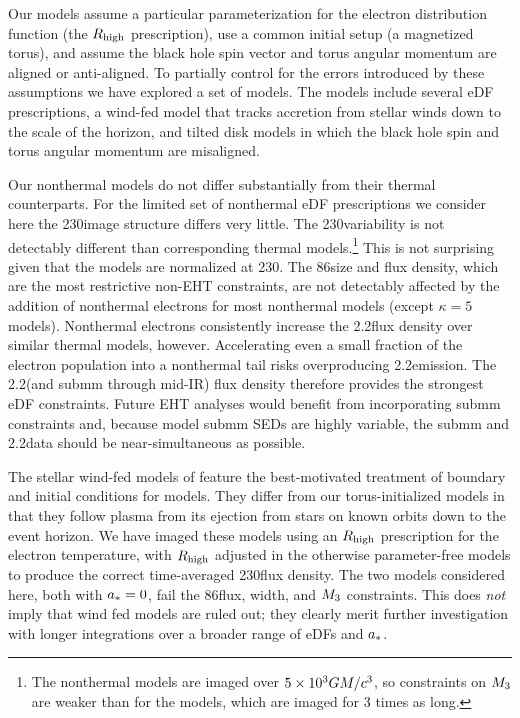 Our \fiducial models assume a particular parameterization for the electron distribution function (the $R_\mathrm{high}$ prescription), use a common initial setup (a magnetized torus), and assume the black hole spin vector and torus angular momentum are aligned or anti-aligned.
To partially control for the errors introduced by these assumptions we have explored a set of \extended models.
The \extended models include several eDF prescriptions, a wind-fed model that tracks accretion from stellar winds down to the scale of the horizon, and tilted disk models in which the black hole spin and torus angular momentum are misaligned.

Our nonthermal models do not differ substantially from their thermal counterparts.
For the limited set of nonthermal eDF prescriptions we consider here the 230\GHz image structure differs very little.
The 230\GHz variability is not detectably different than corresponding thermal models.\footnote{The nonthermal models are imaged over $5\times 10^3GM/c^3$, so constraints on $M_{3}$ are weaker than for the \fiducial models, which are imaged for 3 times as long.}
This is not surprising given that the models are normalized at 230\GHz.
The 86\GHz size and flux density, which are the most restrictive non-EHT constraints, are not detectably affected by the addition of nonthermal electrons for most nonthermal models (except $\kappa = 5$ models).
Nonthermal electrons consistently increase the 2.2\um flux density over similar thermal models, however.
Accelerating even a small fraction of the electron population into a nonthermal tail risks overproducing 2.2\um emission.
The 2.2\um (and submm through mid-IR) flux density therefore provides the strongest eDF constraints.
Future EHT analyses would benefit from incorporating submm constraints \citep[e.g.,][]{2019ApJ...881L...2B} and, because model submm SEDs are highly variable, the submm and 2.2\um data should be near-simultaneous as possible.

The stellar wind-fed models of \citet{2020ApJ...896L...6R} feature the best-motivated treatment of boundary and initial conditions for \sgra models.
They differ from our torus-initialized \fiducial models in that they follow plasma from its ejection from stars on known orbits down to the event horizon.
We have imaged these models using an $R_\mathrm{high}$ prescription for the electron temperature, with $R_\mathrm{high}$ adjusted in the otherwise parameter-free models to produce the correct time-averaged 230\GHz flux density.
The two models considered here, both with $a_* = 0$, fail the 86\GHz flux, \mring width, and $M_{3}$ constraints.
This does {\em not} imply that wind fed models are ruled out; they clearly merit further investigation with longer integrations over a broader range of eDFs and $a_*$.

